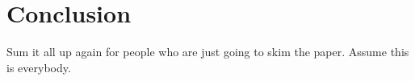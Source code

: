 \section{Conclusion}\label{conclude}
Sum it all up again for people who are just going to skim the paper. Assume this is everybody.
